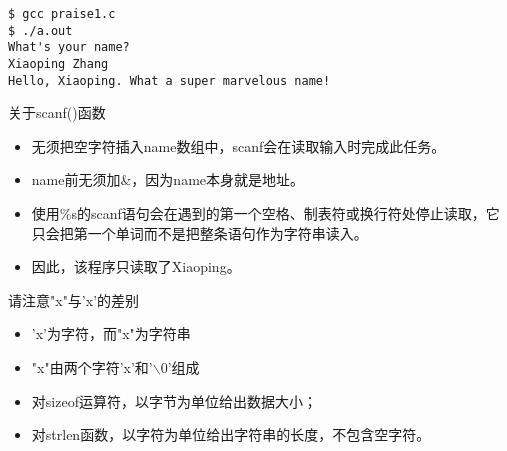 \begin{frame}[fragile]

\begin{lstlisting}[backgroundcolor=\color{red!10}]
$ gcc praise1.c
$ ./a.out
What's your name?
Xiaoping Zhang
Hello, Xiaoping. What a super marvelous name!
\end{lstlisting}

\end{frame}

\begin{frame}[fragile]
关于scanf()函数

\begin{itemize}
\item \tf 无须把空字符插入name数组中，scanf会在读取输入时完成此任务。\\[0.1in]
\item name前无须加\&，因为name本身就是地址。\\[0.1in]
\item 使用\%s的scanf语句会在遇到的第一个空格、制表符或换行符处停止读取，它只会把第一个单词而不是把整条语句作为字符串读入。\\[0.1in]
\item[] 因此，该程序只读取了Xiaoping。

\end{itemize}
\end{frame}

\begin{frame}[fragile]
请注意"x"与'x'的差别\vspace{0.1in}

\begin{itemize}
\item 'x'为字符，而"x"为字符串\\[0.1in]
\item "x"由两个字符'x'和'$\backslash$0'组成

\end{itemize}
\end{frame}

\begin{frame}[fragile]
\begin{itemize}
\item 对sizeof运算符，以字节为单位给出数据大小；\\[0.1in]
\item 对strlen函数，以字符为单位给出字符串的长度，不包含空字符。

\end{itemize}

\end{frame}

